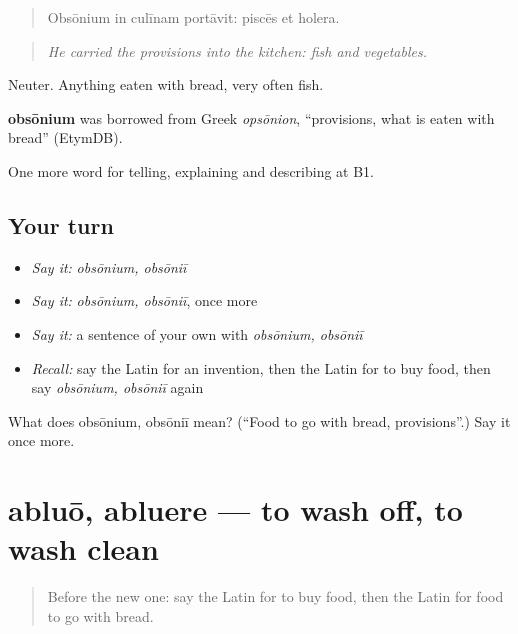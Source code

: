 \begin{quote}
Obsōnium in culīnam portāvit: piscēs et holera.
\end{quote}

\begin{quote}
\emph{He carried the provisions into the kitchen: fish and vegetables.}
\end{quote}

Neuter. Anything eaten with bread, very often fish.

\begin{cousinweb}
\textbf{obsōnium} was borrowed from Greek \emph{opsōnion}, \textquotedblleft{}provisions, what is eaten with bread\textquotedblright{} (EtymDB).
\end{cousinweb}

\begin{grammarlens}[title={What you've built}]
One more word for telling, explaining and describing at B1.
\end{grammarlens}

\subsection*{Your turn}
\begin{itemize}
\raggedright
  \item \emph{Say it:} \emph{obsōnium, obsōniī}
  \item \emph{Say it:} \emph{obsōnium, obsōniī}, once more
  \item \emph{Say it:} a sentence of your own with \emph{obsōnium, obsōniī}
  \item \emph{Recall:} say the Latin for an invention, then the Latin for to buy food, then say \emph{obsōnium, obsōniī} again
\end{itemize}

\begin{tcolorbox}[breakable,colback=teal!4,colframe=teal!35!black,title={Before you move on}]
What does obsōnium, obsōniī mean? (\textquotedblleft{}Food to go with bread, provisions\textquotedblright{}.) Say it once more.
\end{tcolorbox}
\section[abluō, abluere]{abluō, abluere — to wash off, to wash clean}

\label{lesson:LA-C350-abluo}



\begin{quote}
Before the new one: say the Latin for to buy food, then the Latin for food to go with bread.
\end{quote}

